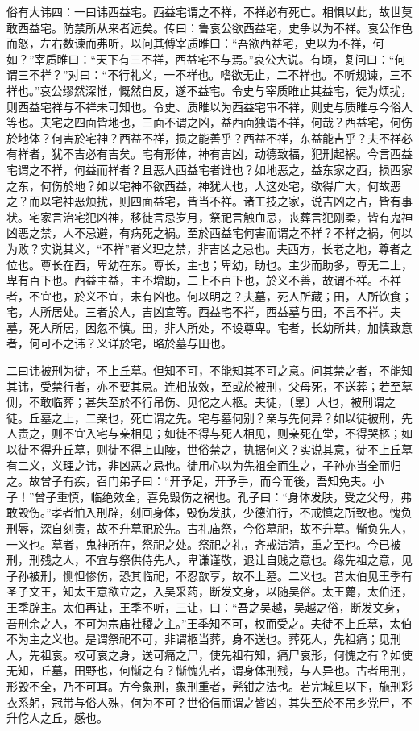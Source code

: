 \documentclass[]{article}
\begin{document}
俗有大讳四：一曰讳西益宅。西益宅谓之不祥，不祥必有死亡。相惧以此，故世莫敢西益宅。防禁所从来者远矣。传曰：鲁哀公欲西益宅，史争以为不祥。哀公作色而怒，左右数谏而弗听，以问其傅宰质睢曰：``吾欲西益宅，史以为不祥，何如？''宰质睢曰：``天下有三不祥，西益宅不与焉。''哀公大说。有顷，复问曰：``何谓三不祥？''对曰：``不行礼义，一不祥也。嗜欲无止，二不祥也。不听规谏，三不祥也。''哀公缪然深惟，慨然自反，遂不益宅。令史与宰质睢止其益宅，徒为烦扰，则西益宅祥与不祥未可知也。令史、质睢以为西益宅审不祥，则史与质睢与今俗人等也。夫宅之四面皆地也，三面不谓之凶，益西面独谓不祥，何哉？西益宅，何伤於地体？何害於宅神？西益不祥，损之能善乎？西益不祥，东益能吉乎？夫不祥必有祥者，犹不吉必有吉矣。宅有形体，神有吉凶，动德致福，犯刑起祸。今言西益宅谓之不祥，何益而祥者？且恶人西益宅者谁也？如地恶之，益东家之西，损西家之东，何伤於地？如以宅神不欲西益，神犹人也，人这处宅，欲得广大，何故恶之？而以宅神恶烦扰，则四面益宅，皆当不祥。诸工技之家，说吉凶之占，皆有事状。宅家言治宅犯凶神，移徙言忌岁月，祭祀言触血忌，丧葬言犯刚柔，皆有鬼神凶恶之禁，人不忌避，有病死之祸。至於西益宅何害而谓之不祥？不祥之祸，何以为败？实说其义，``不祥''者义理之禁，非吉凶之忌也。夫西方，长老之地，尊者之位也。尊长在西，卑幼在东。尊长，主也；卑幼，助也。主少而助多，尊无二上，卑有百下也。西益主益，主不增助，二上不百下也，於义不善，故谓不祥。不祥者，不宜也，於义不宜，未有凶也。何以明之？夫墓，死人所藏；田，人所饮食；宅，人所居处。三者於人，吉凶宜等。西益宅不祥，西益墓与田，不言不祥。夫墓，死人所居，因忽不慎。田，非人所处，不设尊卑。宅者，长幼所共，加慎致意者，何可不之讳？义详於宅，略於墓与田也。

二曰讳被刑为徒，不上丘墓。但知不可，不能知其不可之意。问其禁之者，不能知其讳，受禁行者，亦不要其忌。连相放效，至或於被刑，父母死，不送葬；若至墓侧，不敢临葬；甚失至於不行吊伤、见佗之人柩。夫徒，〔辠〕人也，被刑谓之徒。丘墓之上，二亲也，死亡谓之先。宅与墓何别？亲与先何异？如以徒被刑，先人责之，则不宜入宅与亲相见；如徒不得与死人相见，则亲死在堂，不得哭柩；如以徒不得升丘墓，则徒不得上山陵，世俗禁之，执据何义？实说其意，徒不上丘墓有二义，义理之讳，非凶恶之忌也。徒用心以为先祖全而生之，子孙亦当全而归之。故曾子有疾，召门弟子曰：``开予足，开予手，而今而後，吾知免夫。小子！''曾子重慎，临绝效全，喜免毁伤之祸也。孔子曰：``身体发肤，受之父母，弗敢毁伤。''孝者怕入刑辟，刻画身体，毁伤发肤，少德泊行，不戒慎之所致也。愧负刑辱，深自刻责，故不升墓祀於先。古礼庙祭，今俗墓祀，故不升墓。惭负先人，一义也。墓者，鬼神所在，祭祀之处。祭祀之礼，齐戒洁清，重之至也。今已被刑，刑残之人，不宜与祭供侍先人，卑谦谨敬，退让自贱之意也。缘先祖之意，见子孙被刑，恻怛惨伤，恐其临祀，不忍歆享，故不上墓。二义也。昔太伯见王季有圣子文王，知太王意欲立之，入吴采药，断发文身，以随吴俗。太王薨，太伯还，王季辟主。太伯再让，王季不听，三让，曰：``吾之吴越，吴越之俗，断发文身，吾刑余之人，不可为宗庙社稷之主。''王季知不可，权而受之。夫徒不上丘墓，太伯不为主之义也。是谓祭祀不可，非谓柩当葬，身不送也。葬死人，先祖痛；见刑人，先祖哀。权可哀之身，送可痛之尸，使先祖有知，痛尸哀形，何愧之有？如使无知，丘墓，田野也，何惭之有？惭愧先者，谓身体刑残，与人异也。古者用刑，形毁不全，乃不可耳。方今象刑，象刑重者，髡钳之法也。若完城旦以下，施刑彩衣系躬，冠带与俗人殊，何为不可？世俗信而谓之皆凶，其失至於不吊乡党尸，不升佗人之丘，感也。
\end{document}

